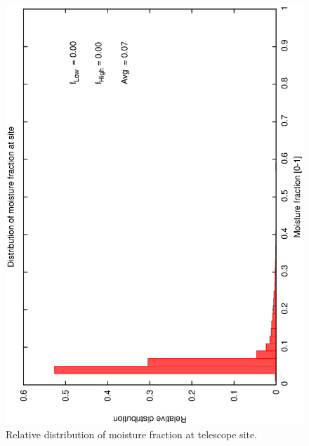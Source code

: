 \clearpage 
\begin{figure}[htbp]
\begin{center}
     \includegraphics[scale=0.4, angle=-90]{figures/ecs/moist.dat.eps}
\caption[Relative distribution of moisture fraction at telescope site.]
{Relative distribution of moisture fraction at telescope site.}
\end{center}   
\label{fig:met_moisture_dist}
\end{figure}

